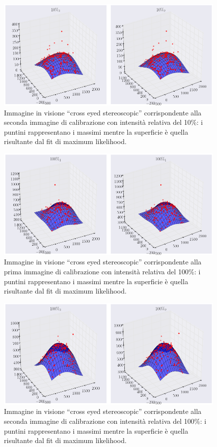 \begin{figure}
 \centering
 \includegraphics[scale=.45]{img/CAP4gauss2.png}
 \caption{\small{Immagine in visione ``cross eyed stereoscopic'' corrispondente alla seconda immagine di calibrazione con intensità relativa del 10\%: i puntini rappresentano i massimi mentre la superficie è quella risultante dal fit di maximum likelihood.}}
 \label{fig:gauss2}
\end{figure}

\begin{figure}
 \centering
 \includegraphics[scale=.45]{img/CAP4gauss3.png}
 \caption{\small{Immagine in visione ``cross eyed stereoscopic'' corrispondente alla prima immagine di calibrazione con intensità relativa del 100\%: i puntini rappresentano i massimi mentre la superficie è quella risultante dal fit di maximum likelihood.}}
 \label{fig:gauss3}
\end{figure}

\begin{figure}
 \centering
 \includegraphics[scale=.45]{img/CAP4gauss4.png}
 \caption{\small{Immagine in visione ``cross eyed stereoscopic'' corrispondente alla seconda immagine di calibrazione con intensità relativa del 100\%: i puntini rappresentano i massimi mentre la superficie è quella risultante dal fit di maximum likelihood.}}
 \label{fig:gauss4}
\end{figure}


